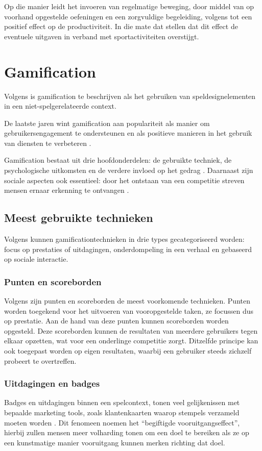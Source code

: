 Op die manier leidt het invoeren van regelmatige beweging, door middel van op voorhand opgestelde oefeningen en een zorgvuldige begeleiding, volgens \textcite{Cancelliere2011} tot een positief effect op de productiviteit. In die mate dat \textcite{Sjoegaard2016} stellen dat dit effect de eventuele uitgaven in verband met sportactiviteiten overstijgt.

\section{Gamification}
Volgens \textcite{Deterding2011} is gamification te beschrijven als het gebruiken van speldesignelementen in een niet-spelgerelateerde context.

De laatste jaren wint gamification aan populariteit als manier om gebruikersengagement te ondersteunen en als positieve manieren in het gebruik van diensten te verbeteren \autocite{Hamari2014}.

Gamification bestaat uit drie hoofdonderdelen: de gebruikte techniek, de psychologische uitkomsten en de verdere invloed op het gedrag \autocite{Hamari2014}. Daarnaast zijn sociale aspecten ook essentieel: door het ontstaan van een competitie streven mensen ernaar erkenning te ontvangen \autocite{Hamari2013}.

\subsection{Meest gebruikte technieken}
Volgens \textcite{Legaki2020} kunnen gamificationtechnieken in drie types gecategoriseerd worden: focus op prestaties of uitdagingen, onderdompeling in een verhaal en gebaseerd op sociale interactie.

\subsubsection{Punten en scoreborden}
Volgens \textcite{Hamari2014} zijn punten en scoreborden de meest voorkomende technieken. Punten worden toegekend voor het uitvoeren van vooropgestelde taken, ze focussen dus op prestatie. Aan de hand van deze punten kunnen scoreborden worden opgesteld. Deze scoreborden kunnen de resultaten van meerdere gebruikers tegen elkaar opzetten, wat voor een onderlinge competitie zorgt. Ditzelfde principe kan ook toegepast worden op eigen resultaten, waarbij een gebruiker steeds zichzelf probeert te overtreffen.

\subsubsection{Uitdagingen en badges}
Badges en uitdagingen binnen een spelcontext, tonen veel gelijkenissen met bepaalde marketing tools, zoals klantenkaarten waarop stempels verzameld moeten worden \autocite{Nunes2006}. Dit fenomeen noemen \textcite{Nunes2006} het ``begiftigde vooruitgangseffect'', hierbij zullen mensen meer volharding tonen om een doel te bereiken als ze op een kunstmatige manier vooruitgang kunnen merken richting dat doel.

